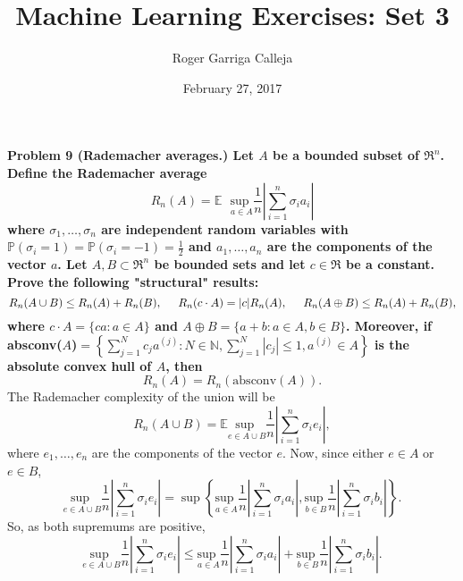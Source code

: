 \documentclass[11pt, english]{article}
\title{Machine Learning Exercises: Set 3}
\author{Roger Garriga Calleja}
\date{February 27, 2017}
\newcommand{\su}[2]{\sum\limits_{#1}^{#2}}
\begin{document}
	\maketitle
\textbf{Problem 9 (Rademacher averages.) Let $A$ be a bounded subset of $\Re^n$. Define the Rademacher
average}
\begin{equation}
	R_n(A)=\mathbb{E}\text{ }\underset{a\in A}{\text{sup }}\frac{1}{n}\left|\su{i=1}{n}\sigma_ia_i\right|
\end{equation}
\textbf{where $\sigma_1,\dots,\sigma_n$ are independent random variables with $\mathbb{P}(\sigma_i=1)=\mathbb{P}(\sigma_i=-1)=\frac{1}{2}$ and $a_1,\dots,a_n$ are the components of the vector $a$. Let $A,B\subset\Re^n$ be bounded sets and let $c\in\Re$ be a constant. Prove the following "structural" results:}
\begin{equation}
	R_n(A\cup B)\leq R_n(A)+R_n(B),\hspace{0.5cm}R_n(c\cdot A)=|c|R_n(A),\hspace{0.5cm}R_n(A\oplus B)\leq R_n(A)+R_n(B),
\end{equation}
\textbf{where $c\cdot A=\{ca:a\in A\}$ and $A\oplus B=\{a+b:a\in A, b\in B\}$. Moreover, if absconv($A$)$=\left\{\su{j=1}{N}c_ja^{(j)}:N\in\mathbb{N},\su{j=1}{N}|c_j|\leq 1,a^{(j)}\in A\right\}$ is the absolute convex hull of $A$, then}
\begin{equation}
	R_n(A)=R_n(\text{absconv}(A)).
\end{equation}
The Rademacher complexity of the union will be 
\begin{equation}
	R_n(A\cup B)=\mathbb{E}\underset{e\in A\cup B}{\text{sup }}\frac{1}{n}\left|\su{i=1}{n}\sigma_i e_i\right|,
\end{equation}
where $e_1,\dots,e_n$ are the components of the vector $e$. Now, since either $e\in A$ or $e\in B$,
\begin{equation}
	\underset{e\in A\cup B}{\text{sup }}\frac{1}{n}\left|\su{i=1}{n}\sigma_i e_i\right|=\sup\left\{\underset{a\in A}{\text{sup }}\frac{1}{n}\left|\su{i=1}{n}\sigma_i a_i\right|,\underset{b\in B}{\text{sup }}\frac{1}{n}\left|\su{i=1}{n}\sigma_i b_i\right|\right\}.
\end{equation} 
So, as both supremums are positive,
\begin{equation}
	\underset{e\in A\cup B}{\text{sup }}\frac{1}{n}\left|\su{i=1}{n}\sigma_i e_i\right|\leq \underset{a\in A}{\text{sup }}\frac{1}{n}\left|\su{i=1}{n}\sigma_i a_i\right|+\underset{b\in B}{\text{sup }}\frac{1}{n}\left|\su{i=1}{n}\sigma_i b_i\right|.
\end{equation}
\end{document}
